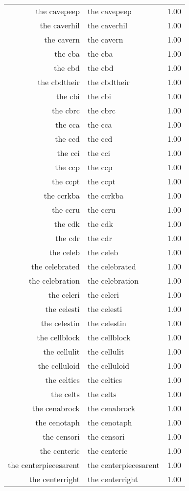 \begin{table}[ht]
\begin{tabular}{rlr}
  the cavepeep & the cavepeep & 1.00 \\ 
  the caverhil & the caverhil & 1.00 \\ 
  the cavern & the cavern & 1.00 \\ 
  the cba & the cba & 1.00 \\ 
  the cbd & the cbd & 1.00 \\ 
  the cbdtheir & the cbdtheir & 1.00 \\ 
  the cbi & the cbi & 1.00 \\ 
  the cbrc & the cbrc & 1.00 \\ 
  the cca & the cca & 1.00 \\ 
  the ccd & the ccd & 1.00 \\ 
  the cci & the cci & 1.00 \\ 
  the ccp & the ccp & 1.00 \\ 
  the ccpt & the ccpt & 1.00 \\ 
  the ccrkba & the ccrkba & 1.00 \\ 
  the ccru & the ccru & 1.00 \\ 
  the cdk & the cdk & 1.00 \\ 
  the cdr & the cdr & 1.00 \\ 
  the celeb & the celeb & 1.00 \\ 
  the celebrated & the celebrated & 1.00 \\ 
  the celebration & the celebration & 1.00 \\ 
  the celeri & the celeri & 1.00 \\ 
  the celesti & the celesti & 1.00 \\ 
  the celestin & the celestin & 1.00 \\ 
  the cellblock & the cellblock & 1.00 \\ 
  the cellulit & the cellulit & 1.00 \\ 
  the celluloid & the celluloid & 1.00 \\ 
  the celtics & the celtics & 1.00 \\ 
  the celts & the celts & 1.00 \\ 
  the cenabrock & the cenabrock & 1.00 \\ 
  the cenotaph & the cenotaph & 1.00 \\ 
  the censori & the censori & 1.00 \\ 
  the centeric & the centeric & 1.00 \\ 
  the centerpiecesarent & the centerpiecesarent & 1.00 \\ 
  the centerright & the centerright & 1.00 \\ 

\end{tabular}
\end{table}
